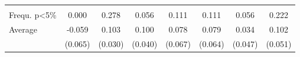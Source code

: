 \begin{table}
\begin{tabular}[t]{lccccccc}
\addlinespace[0.3em]
\multicolumn{8}{l}{\textbf{Annual}}\\
\hspace{1em}Frequ. p<5\% & 0.000 & 0.278 & 0.056 & 0.111 & 0.111 & 0.056 & 0.222\\
\hspace{1em}Average & -0.059 & 0.103 & 0.100 & 0.078 & 0.079 & 0.034 & 0.102\\
\hspace{1em} & (0.065) & (0.030) & (0.040) & (0.067) & (0.064) & (0.047) & (0.051)\\
\bottomrule
\end{tabular}
\end{table}
